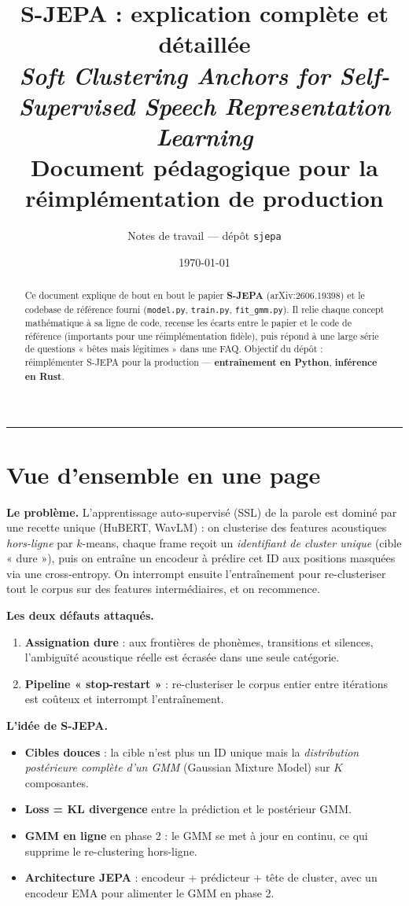 \documentclass[11pt,a4paper]{article}
\title{\textbf{S-JEPA : explication complète et détaillée}\\[0.4em]
       \large \emph{Soft Clustering Anchors for Self-Supervised Speech
       Representation Learning}\\[0.6em]
       \normalsize Document pédagogique pour la réimplémentation de production}
\author{Notes de travail --- dépôt \texttt{sjepa}}
\date{\today}
\newcommand{\file}[1]{\texttt{#1}}
\begin{document}
\maketitle

\begin{abstract}
\noindent
Ce document explique de bout en bout le papier \textbf{S-JEPA}
(arXiv:2606.19398) et le codebase de référence fourni
(\file{model.py}, \file{train.py}, \file{fit\_gmm.py}). Il relie
chaque concept mathématique à sa ligne de code, recense les écarts
entre le papier et le code de référence (importants pour une
réimplémentation fidèle), puis répond à une large série de questions
« bêtes mais légitimes » dans une FAQ. Objectif du dépôt :
réimplémenter S-JEPA pour la production --- \textbf{entraînement en
Python}, \textbf{inférence en Rust}.
\end{abstract}

\tableofcontents
\bigskip\hrule

\section{Vue d'ensemble en une page}

\textbf{Le problème.} L'apprentissage auto-supervisé (SSL) de la parole
est dominé par une recette unique (HuBERT, WavLM) : on clusterise des
features acoustiques \emph{hors-ligne} par $k$-means, chaque frame reçoit
un \emph{identifiant de cluster unique} (cible « dure »), puis on entraîne
un encodeur à prédire cet ID aux positions masquées via une
cross-entropy. On interrompt ensuite l'entraînement pour re-clusteriser
tout le corpus sur des features intermédiaires, et on recommence.

\textbf{Les deux défauts attaqués.}
\begin{enumerate}[leftmargin=*]
  \item \textbf{Assignation dure} : aux frontières de phonèmes, transitions
  et silences, l'ambiguïté acoustique réelle est écrasée dans une seule
  catégorie.
  \item \textbf{Pipeline « stop-restart »} : re-clusteriser le corpus entier
  entre itérations est coûteux et interrompt l'entraînement.
\end{enumerate}

\textbf{L'idée de S-JEPA.}
\begin{itemize}[leftmargin=*]
  \item \textbf{Cibles douces} : la cible n'est plus un ID unique mais la
  \emph{distribution postérieure complète d'un GMM} (Gaussian Mixture Model)
  sur $K$ composantes.
  \item \textbf{Loss = KL divergence} entre la prédiction et le postérieur GMM.
  \item \textbf{GMM en ligne} en phase 2 : le GMM se met à jour en continu,
  ce qui supprime le re-clustering hors-ligne.
  \item \textbf{Architecture JEPA} : encodeur + prédicteur + tête de cluster,
  avec un encodeur EMA pour alimenter le GMM en phase 2.
\end{itemize}
\end{document}
